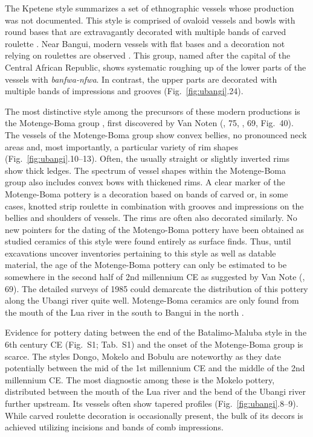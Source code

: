 \documentclass[smallextended,natbib]{svjour3}       %
\begin{document}
The Kpetene style summarizes a set of ethnographic vessels whose production was not documented. This style is comprised of ovaloid vessels and bowls with round bases that are extravagantly decorated with multiple bands of carved roulette \citep[103--105]{Seidensticker.2021e}. Near Bangui, modern vessels with flat bases and a decoration not relying on roulettes are observed \citep[112--114]{Seidensticker.2021e}. This group, named after the capital of the Central African Republic, shows systematic roughing up of the lower parts of the vessels with \textit{banfwa-nfwa}. In contrast, the upper parts are decorated with multiple bands of impressions and grooves (Fig.~\ref{fig:ubangi}.24).

The most distinctive style among the precursors of these modern productions is the Motenge-Boma group \citep[99--103]{Seidensticker.2021e}, first discovered by Van Noten (\citeyear{vanNoten.1978}, 75, \citeyear{vanNoten.1982a}, 69, Fig.~40). The vessels of the Motenge-Boma group show convex bellies, no pronounced neck areas and, most importantly, a particular variety of rim shapes (Fig.~\ref{fig:ubangi}.10--13). Often, the usually straight or slightly inverted rims show thick ledges. The spectrum of vessel shapes within the Motenge-Boma group also includes convex bows with thickened rims. A clear marker of the Motenge-Boma pottery is a decoration based on bands of carved or, in some cases, knotted strip roulette in combination with grooves and impressions on the bellies and shoulders of vessels. The rims are often also decorated similarly. No new pointers for the dating of the Motengo-Boma pottery have been obtained as studied ceramics of this style were found entirely as surface finds. Thus, until excavations uncover inventories pertaining to this style as well as datable material, the age of the Motenge-Boma pottery can only be estimated to be somewhere in the second half of 2nd millennium CE as suggested by Van Note (\citeyear{vanNoten.1982a}, 69). The detailed surveys of 1985 could demarcate the distribution of this pottery along the Ubangi river quite well. Motenge-Boma ceramics are only found from the mouth of the Lua river in the south to Bangui in the north \citep[Fig.~\ref{fig:timeslices_2_lia}D--E;][102 Fig.~37]{Seidensticker.2021e}.

Evidence for pottery dating between the end of the Batalimo-Maluba style in the 6th century CE (Fig.~S1; Tab.~S1) and the onset of the Motenge-Boma group is scarce. The styles Dongo, Mokelo and Bobulu \citep[Fig.~\ref{fig:chrono};][86--95]{Seidensticker.2021e} are noteworthy as they date potentially between the mid of the 1st millennium CE and the middle of the 2nd millennium CE. The most diagnostic among these is the Mokelo pottery, distributed between the mouth of the Lua river and the bend of the Ubangi river further upstream. Its vessels often show tapered profiles (Fig.~\ref{fig:ubangi}.8--9). While carved roulette decoration is occasionally present, the bulk of its decors is achieved utilizing incisions and bands of comb impressions.
\end{document}
